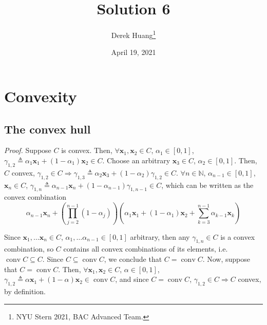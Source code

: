 \documentclass{article}
\title{Solution 6}
\author{Derek Huang\thanks{NYU Stern 2021, BAC Advanced Team.}}
\date{April 19, 2021}
\numberwithin{equation}{section}
\begin{document}
\maketitle
\thispagestyle{fancy}


\section{Convexity}

\subsection{The convex hull}

\textit{Proof.} Suppose $ C $ is convex. Then, $ \forall \mathbf{x}_1,
\mathbf{x}_2 \in C $, $ \alpha_1 \in [0, 1] $, $ \gamma_{1, 2} \triangleq
\alpha_1\mathbf{x}_1 + (1 - \alpha_1)\mathbf{x}_2 \in C $. Choose an arbitrary
$ \mathbf{x}_3 \in C $, $ \alpha_2 \in [0, 1] $. Then, $ C $ convex,
$ \gamma_{1, 2} \in C \Rightarrow \gamma_{1, 3} \triangleq
\alpha_2\mathbf{x}_3 + (1 - \alpha_2)\gamma_{1, 2} \in C $. $ \forall n \in
\mathbb{N} $, $ \alpha_{n - 1} \in [0, 1] $, $ \mathbf{x}_n \in C $,
$ \gamma_{1, n} \triangleq \alpha_{n - 1}\mathbf{x}_n + (1 - \alpha_{n - 1})
\gamma_{1, n - 1} \in C $, which can be written as the convex combination
\begin{equation*}
    \alpha_{n - 1}\mathbf{x}_n + \left(
        \prod_{j = 2}^{n - 1}(1 - \alpha_j)
    \right)\left(
        \alpha_1\mathbf{x}_1 + (1 - \alpha_1)\mathbf{x}_2 +
        \sum_{k = 3}^{n - 1}\alpha_{k - 1}\mathbf{x}_k
    \right)
\end{equation*}

Since $ \mathbf{x}_1, \ldots \mathbf{x}_n \in C $, $ \alpha_1, \ldots
\alpha_{n - 1} \in [0, 1] $ arbitrary, then any $ \gamma_{1, n} \in C $ is a
convex combination, so $ C $ contains all convex combinations of its elements,
i.e. $ \operatorname{conv} C \subseteq C $. Since $ C \subseteq
\operatorname{conv} C $, we conclude that $ C = \operatorname{conv} C $. Now,
suppose that $ C = \operatorname{conv} C $. Then, $ \forall \mathbf{x}_1,
\mathbf{x}_2 \in C $, $ \alpha \in [0, 1] $, $ \gamma_{1, 2} \triangleq
\alpha\mathbf{x}_1 + (1 - \alpha)\mathbf{x}_2 \in \operatorname{conv} C $, and
since $ C = \operatorname{conv} C $, $ \gamma_{1, 2} \in C \Rightarrow C $
convex, by definition.
\end{document}
